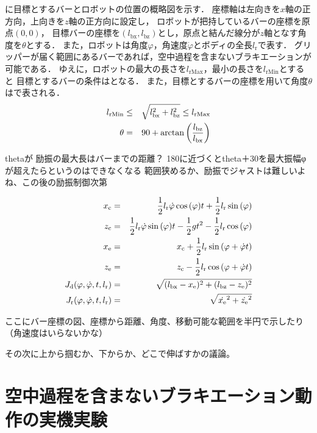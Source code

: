         に目標とするバーとロボットの位置の概略図を示す．
        座標軸は左向きを$x$軸の正方向，上向きを$z$軸の正方向に設定し，
        ロボットが把持しているバーの座標を原点$(0,0)$，
        目標バーの座標を$(l_{\mathrm{bx}},l_{\mathrm{bz}})$とし，原点と結んだ線分が$z$軸となす角度を$\theta$とする．
        また，ロボットは角度$\varphi$，角速度$\dot{\varphi}$とボディの全長$l_{\mathrm{r}}$で表す．
        グリッパーが届く範囲にあるバーであれば，空中過程を含まないブラキエーションが可能である．
        ゆえに，ロボットの最大の長さを$l_{\mathrm{rMax}}$，最小の長さを$l_{\mathrm{rMin}}$とすると
        目標とするバーの条件はとなる．
        また，目標とするバーの座標を用いて角度$\theta$はで表される．
        \begin{eqnarray}
                \equlabel{barRange}
                l_{\mathrm{rMin}} &\le& \sqrt{l_{\mathrm{bx}}^2+l_{\mathrm{bz}}^2} \le l_{\mathrm{rMax}}\\
                \equlabel{theta}
                \theta&=&90+\arctan{\left(\frac{l_{\mathrm{bz}}}{l_{\mathrm{bx}}}\right)}
                \end{eqnarray}  
        

        thetaが
        励振の最大長はバーまでの距離？
        180に近づくとtheta＋30を最大振幅φが超えたらというのはできなくなる
        範囲狭めるか、励振でジャストは難しいよね、この後の励振制御次第

        \begin{eqnarray}
                \equlabel{lr-range}
                x_{\mathrm{c}}&=&\frac{1}{2}l_{\mathrm{r}}\dot{\varphi}\cos{(\varphi)}t+\frac{1}{2}l_{\mathrm{r}}\sin{(\varphi)}\\
                \equlabel{bar}
                z_{\mathrm{c}}&=&\frac{1}{2}l_{\mathrm{r}}\dot{\varphi}\sin{(\varphi)}t-\frac{1}{2}gt^2-\frac{1}{2}l_{\mathrm{r}}\cos{(\varphi)}\\
                \equlabel{x-e}
                x_{\mathrm{e}}&=&x_{\mathrm{c}}+\frac{1}{2}l_{\mathrm{r}}\sin{(\varphi+\dot{\varphi}t)}\\
                \equlabel{z-e}
                z_{\mathrm{e}}&=&z_{\mathrm{c}}-\frac{1}{2}l_{\mathrm{r}}\cos{(\varphi+\dot{\varphi}t)}\\
                \equlabel{Jd}
                  J_{\mathrm{d}}(\varphi,\dot{\varphi},t,l_{\mathrm{r}})
                  &=&\sqrt{(l_{\mathrm{bx}}-x_{\mathrm{e}})^2+(l_{\mathrm{bz}}-z_{\mathrm{e}})^2}\\
                \equlabel{Jr}
                J_{\mathrm{r}}(\varphi,\dot{\varphi},t,l_{\mathrm{r}})
                &=&\sqrt{\dot{x_{\mathrm{e}}}^2+\dot{z_{\mathrm{e}}}^2}
              \end{eqnarray}  




        ここにバー座標の図、座標から距離、角度、移動可能な範囲を半円で示したり（角速度はいらないかな）

        その次に上から掴むか、下からか、どこで伸ばすかの議論。

        \section{空中過程を含まないブラキエーション動作の実機実験}


